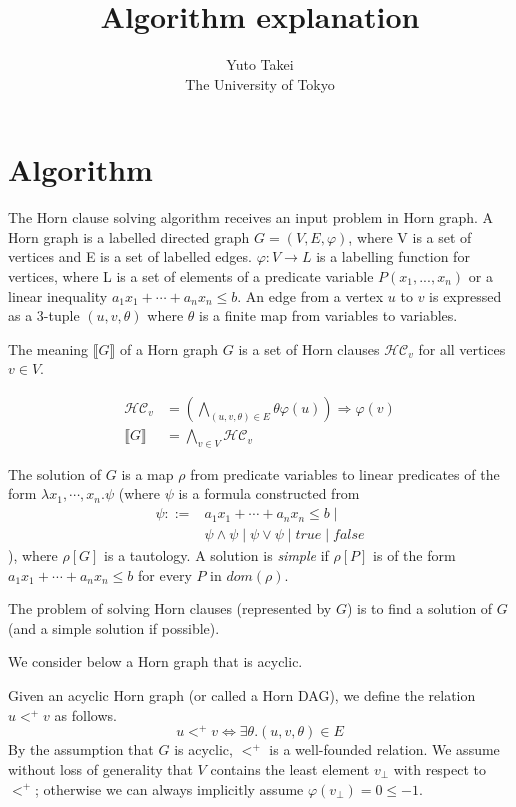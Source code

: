 \documentclass[a4paper,12pt]{article}
\title{Algorithm explanation}
\author{Yuto Takei \\ The University of Tokyo}
\begin{document}
\maketitle

\section{Algorithm}

The Horn clause solving algorithm receives an input problem in Horn
graph. A Horn graph is a labelled directed graph $G=(V,E,\varphi)$,
where V is a set of vertices and E is a set of labelled
edges. $\varphi: V \rightarrow L$ is a labelling function for
vertices, where L is a set of elements of a predicate variable $P(x_1,
..., x_n)$ or a linear inequality $a_1 x_1 + \cdots + a_n x_n \leq b$.
An edge from a vertex $u$ to $v$ is expressed as a 3-tuple
$(u,v,\theta)$ where $\theta$ is a finite map from variables to
variables.

The meaning $\llbracket G \rrbracket $ of a Horn graph $G$ is a set of
Horn clauses $\mathcal{HC}_v$ for all vertices $v \in V$.

\begin{align*}
\mathcal{HC}_v & = \left( \bigwedge_{(u,v,\theta) \in E} \theta \varphi(u) \right) \Longrightarrow \varphi(v) \\
\llbracket G \rrbracket & = \bigwedge_{v \in V} \mathcal{HC}_v
\end{align*}

The solution of $G$ is a map $\rho$ from predicate variables to linear
predicates of the form $\lambda x_1, \cdots ,x_n. \psi $ (where $\psi$
is a formula constructed from
\begin{align*}
\psi ::= & a_1 x_1 + \cdots + a_n x_n \leq b \mid \\
& \psi \wedge \psi \mid \psi \vee \psi \mid true \mid false
\end{align*}
), where $\rho[G]$ is a tautology. A solution is \textit{simple} if
$\rho[P]$ is of the form $a_1 x_1 + \cdots + a_n x_n \leq b$ for every
$P$ in $dom(\rho)$.

The problem of solving Horn clauses (represented by $G$) is to find a
solution of $G$ (and a simple solution if possible).

We consider below a Horn graph that is acyclic.

Given an acyclic Horn graph (or called a Horn DAG), we define the
relation $u <^+ v$ as follows.
\[ u <^+ v \Longleftrightarrow \exists \theta. (u,v,\theta) \in E \]
By the assumption that $G$ is acyclic, $<^+$ is a well-founded
relation. We assume without loss of generality that $V$ contains the
least element $v_\bot$ with respect to $<^+$; otherwise we can always
implicitly assume $\varphi(v_\bot) = 0 \leq -1$.
\end{document}

